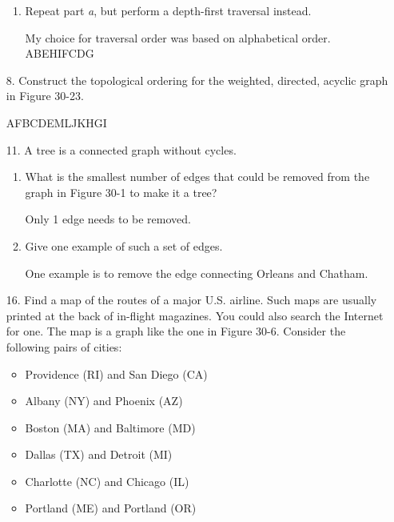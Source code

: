 \documentclass[10pt]{article}
\begin{document}
\begin{enumerate}
\begin{enumerate}
			\item Repeat part \textit{a}, but perform a depth-first traversal instead.
				
				\vspace{0.5cm}
				My choice for traversal order was based on alphabetical order.\\
				ABEHIFCDG
				\vspace{0.5cm}
				
		\end{enumerate}
	
	\item[8.] Construct the topological ordering for the weighted, directed, acyclic graph in Figure 30-23.
		
		\vspace{0.5cm}
		AFBCDEMLJKHGI
		\vspace{0.5cm}
	
	\item[11.] A tree is a connected graph without cycles.
		\begin{enumerate}
			\item What is the smallest number of edges that could be removed from the graph in Figure 30-1 to make it a tree?
				
				\vspace{0.5cm}
				Only 1 edge needs to be removed.
				\vspace{0.5cm}
				
			\item Give one example of such a set of edges.
			
				\vspace{0.5cm}
				One example is to remove the edge connecting Orleans and Chatham.
				\vspace{0.5cm}
		\end{enumerate}
	
	\item[16.] Find a map of the routes of a major U.S. airline. Such maps are usually printed at the back of in-flight magazines. You could also search the Internet for one. The map is a graph like the one in Figure 30-6. Consider the following pairs of cities:
		\begin{itemize}
			\item Providence (RI) and San Diego (CA)
			\item Albany (NY) and Phoenix (AZ)
			\item Boston (MA) and Baltimore (MD)
			\item Dallas (TX) and Detroit (MI)
			\item Charlotte (NC) and Chicago (IL)
			\item Portland (ME) and Portland (OR)		
		\end{itemize}
		

\end{enumerate}
\end{document}
